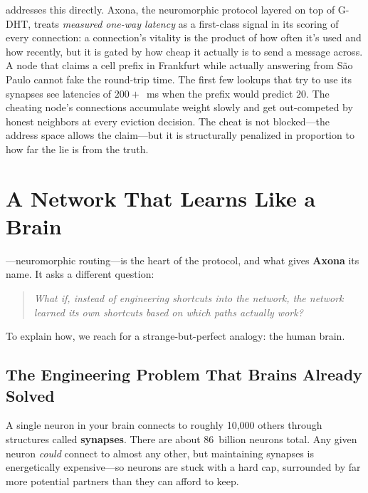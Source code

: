 \documentclass[nobib]{tufte-handout}
\begin{document}
 addresses this directly. Axona, the neuromorphic protocol layered on top of G-DHT, treats \emph{measured one-way latency} as a first-class signal in its scoring of every connection: a connection's vitality is the product of how often it's used and how recently, but it is gated by how cheap it actually is to send a message across. A node that claims a cell prefix in Frankfurt while actually answering from S\~ao Paulo cannot fake the round-trip time. The first few lookups that try to use its synapses see latencies of $200+$~ms when the prefix would predict $20$. The cheating node's connections accumulate weight slowly and get out-competed by honest neighbors at every eviction decision. The cheat is not blocked---the address space allows the claim---but it is structurally penalized in proportion to how far the lie is from the truth.

\section{A Network That Learns Like a Brain}

---neuromorphic routing---is the heart of the protocol, and what gives \textbf{Axona} its name. It asks a different question:

\begin{quote}
\itshape What if, instead of engineering shortcuts into the network, the network learned its own shortcuts based on which paths actually work?
\end{quote}

To explain how, we reach for a strange-but-perfect analogy: the human brain.

\subsection{The Engineering Problem That Brains Already Solved}

A single neuron in your brain connects to roughly 10{,}000 others through structures called \textbf{synapses}. There are about 86~billion neurons total. Any given neuron \emph{could} connect to almost any other, but maintaining synapses is energetically expensive---so neurons are stuck with a hard cap, surrounded by far more potential partners than they can afford to keep.
\end{document}
